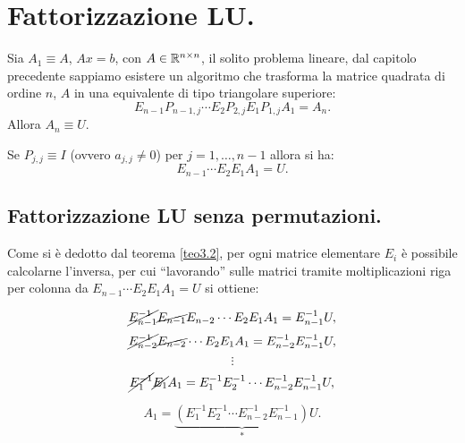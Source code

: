 
\chapter{Fattorizzazione LU.}
\begin{defi}
Sia $A_1 \equiv A$, $Ax = b$, con $A \in \mathbb{R}^{n \times n}$, il solito problema
lineare, dal capitolo precedente sappiamo esistere un algoritmo che trasforma
la matrice quadrata di ordine $n$, $A$ in una equivalente di tipo triangolare
superiore:
\[E_{n-1}P_{n-1,j} \cdots E_{2}P_{2,j}E_{1}P_{1,j}A_{1} = A_n.\]
Allora $A_n \equiv U$.
\end{defi}

\begin{osse}
Se $P_{j,j} \equiv I$ (ovvero $a_{j,j} \neq 0$) per $j = 1, \ldots, n-1$
allora si ha:
\[E_{n-1} \cdots E_{2}E_{1}A_{1} = U.\]
\end{osse}

\section{Fattorizzazione LU senza permutazioni.}
Come si è dedotto dal teorema \ref{teo3.2}, per ogni matrice elementare
$E_i$ è possibile calcolarne l'inversa, per cui ``lavorando'' sulle matrici
tramite moltiplicazioni riga per colonna da
$E_{n-1} \cdots E_{2}E_{1}A_{1} = U$
si ottiene:

\[
\cancel{E_{n-1}^{-1}}\cancel{E_{n-1}}E_{n-2} \cdots E_{2}E_{1}A_{1} =E_{n-1}^{-1} U,
\]
\[
\cancel{E_{n-2}^{-1}}\cancel{E_{n-2}}\cdots E_{2}E_{1}A_{1} =
E_{n-2}^{-1}E_{n-1}^{-1} U,
\]
\[\vdots\]
\[
\cancel{E_{1}^{-1}}\cancel{E_{1}}
A_{1} =E_{1}^{-1}E_{2}^{-1} \cdots E_{n-2}^{-1}E_{n-1}^{-1} U,
\]

\[A_{1} =
\underbrace{\left(E_{1}^{-1}E_{2}^{-1} \cdots E_{n-2}^{-1}E_{n-1}^{-1} \right)}
_{*}
U.\]

